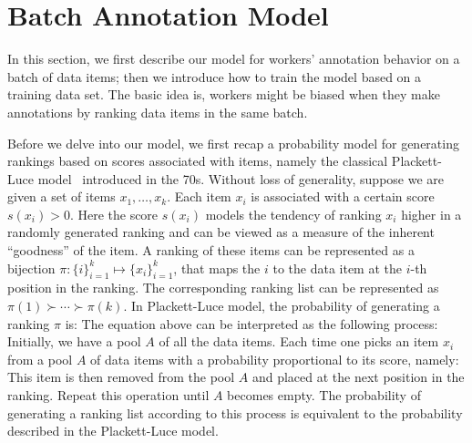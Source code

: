 
\section{Batch Annotation Model}
\label{sec:worker}

In this section, we first describe our model for workers' annotation behavior 
on a batch of data items;
then we introduce how to train the model based on a training data set.
The basic idea is, workers might be biased when they make annotations
by ranking data items in the same batch.  


%

Before we delve into our model, we first recap a probability model for generating rankings
based on scores associated with items, 
namely the classical Plackett-Luce model~\cite{luce:2005, plackett:1975} introduced in the 70s.
Without loss of generality, suppose we are given a set of items $x_1, \ldots, x_k$.
Each item $x_i$ is associated with a certain score $s(x_i) > 0$.  %
Here the score $s(x_i)$ models the tendency of ranking 
$x_i$ higher in a randomly generated ranking and 
can be viewed as a measure of the inherent ``goodness'' of the item.
A ranking of these items can be represented as a bijection $\pi : \{i\}_{i = 1}^k \mapsto \{x_i\}_{i = 1}^k$,
that maps the $i$ to the data item at the $i$-th position in the ranking.
The corresponding ranking list can be represented as
$\pi(1) \succ \cdots \succ \pi(k)$.
In Plackett-Luce model, the probability of generating a ranking $\pi$ is:
%
The equation above can be interpreted as the following process:
Initially, we have a pool $A$ of all the data items.
Each time one picks an item $x_i$ from a pool $A$ of data 
items with a probability proportional to its score, namely:
This item is then removed from the pool $A$ and placed at the next position in the ranking.
Repeat this operation until $A$ becomes empty.
The probability of generating a ranking list according to this process is equivalent to the probability described in the Plackett-Luce model.

